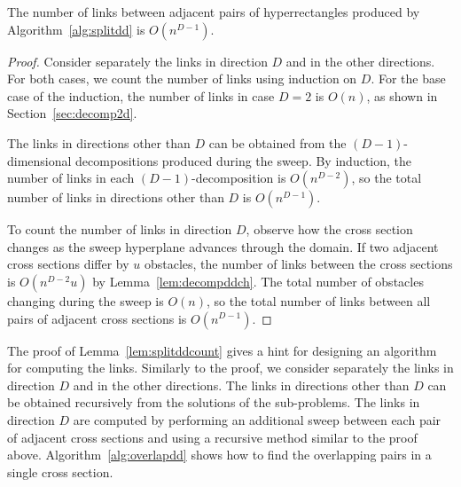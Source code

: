 \documentclass[english,gradu]{tktltiki2018}
\begin{document}
\begin{lem}\label{lem:splitddcount}The number of links between adjacent pairs of hyperrectangles produced by Algorithm~\ref{alg:splitdd} is $O(n^{D-1})$.\end{lem}
\begin{proof}
Consider separately the links in direction $D$ and in the other directions.
For both cases, we count the number of links using induction on $D$.
For the base case of the induction, the number of links in case $D=2$ is $O(n)$, as shown in Section~\ref{sec:decomp2d}.

The links in directions other than $D$ can be obtained from the $(D-1)$-dimensional decompositions produced during the sweep.
By induction, the number of links in each $(D-1)$-decomposition is $O(n^{D-2})$, so the total number of links in directions other than $D$ is $O(n^{D-1})$.

To count the number of links in direction $D$, observe how the cross section changes as the sweep hyperplane advances through the domain.
If two adjacent cross sections differ by $u$ obstacles, the number of links between the cross sections is $O(n^{D-2}u)$ by Lemma~\ref{lem:decompddch}.
The total number of obstacles changing during the sweep is $O(n)$, so the total number of links between all pairs of adjacent cross sections is $O(n^{D-1})$.
\end{proof}

The proof of Lemma~\ref{lem:splitddcount} gives a hint for designing an algorithm for computing the links.
Similarly to the proof, we consider separately the links in direction $D$ and in the other directions.
The links in directions other than $D$ can be obtained recursively from the solutions of the sub-problems.
The links in direction $D$ are computed by performing an additional sweep between each pair of adjacent cross sections and using a recursive method similar to the proof above.
Algorithm~\ref{alg:overlapdd} shows how to find the overlapping pairs in a single cross section.
\end{document}
